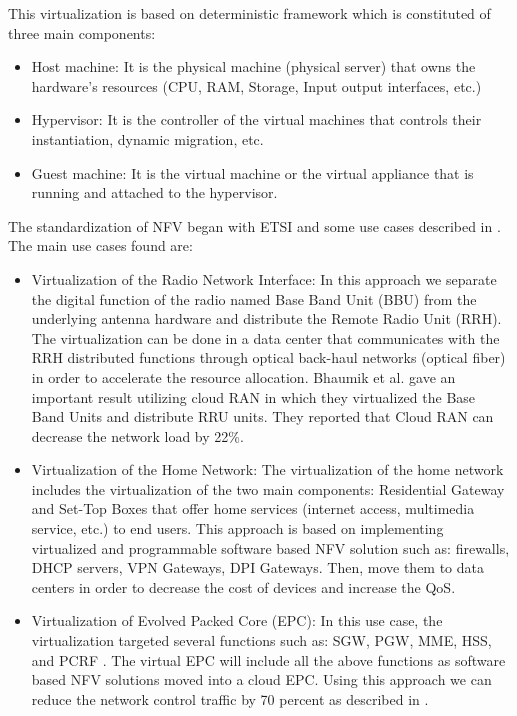 \documentclass[letterpaper,conference]{IEEEtran}
\begin{document}
This virtualization is based on deterministic framework
which is constituted of three main components:
\begin{itemize}
\item Host machine: It is the physical machine (physical
server) that owns the hardware’s resources (CPU,
RAM, Storage, Input output interfaces, etc.)
\item Hypervisor: It is the controller of the virtual
machines that controls their instantiation, dynamic
migration, etc.
\item Guest machine: It is the virtual machine or the
virtual appliance that is running and attached to the
hypervisor.
\end{itemize}

The standardization of NFV began with ETSI and some use
cases described in \cite{[3]}. The main use cases found are:
\begin{itemize}
\item Virtualization of the Radio Network Interface:
In this approach we separate the digital function of the radio named Base Band Unit (BBU) from the underlying antenna hardware and distribute the Remote Radio Unit (RRH). The virtualization can be done in a data center that communicates with the
RRH distributed functions through optical back-haul networks (optical fiber) in order to accelerate the resource allocation. Bhaumik et al. \cite{[4]} gave an important result utilizing cloud RAN in which they virtualized the Base Band Units and distribute RRU units. They reported that Cloud RAN can decrease the network load by 22\%.
\item Virtualization of the Home Network: The virtualization of the home network includes the virtualization of the two main components: Residential Gateway and Set-Top Boxes that offer home services (internet access, multimedia service, etc.) to end users. This approach is based on implementing virtualized and programmable software based NFV solution such as: firewalls, DHCP servers, VPN Gateways, DPI Gateways. Then, move them to data centers in order to decrease the cost of devices and increase the QoS.
\item Virtualization of Evolved Packed Core (EPC): In this use case, the virtualization targeted several functions such as: SGW, PGW, MME, HSS, and PCRF \cite{[1]}. The virtual EPC will include all the above functions as software based NFV solutions moved into a cloud EPC. Using this approach we can reduce the network control traffic by 70 percent as described in \cite{[1]}.
\end{itemize}
\end{document}
